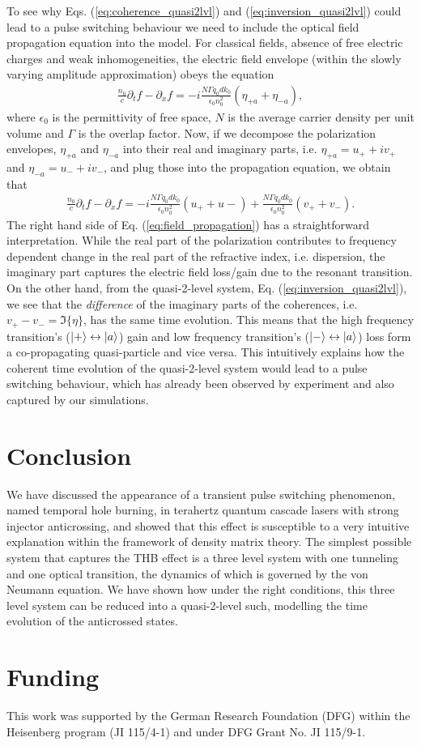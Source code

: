 \documentclass[]{spie}  %
\def\p{\partial}
\begin{document}
To see why Eqs. (\ref{eq:coherence_quasi2lvl}) and (\ref{eq:inversion_quasi2lvl}) could lead to a pulse switching behaviour we need to include the optical field propagation equation into the model. For classical fields, absence of free electric charges and weak inhomogeneities, the electric field envelope (within the slowly varying amplitude approximation) obeys the equation \cite{jirauschek2014modeling}
\begin{align}
	\frac{n_0}{c} \p_t f - \p_x f = -i\frac{N \Gamma q_0d k_0}{\epsilon_0 n_0^2}(\eta_{+a}+\eta_{-a}),
\end{align}
where $\epsilon_0$ is the permittivity of free space, $N$ is the average carrier density per unit volume and $\Gamma$ is the overlap factor. Now, if we decompose the polarization envelopes, $\eta_{+a}$ and $\eta_{-a}$ into their real and imaginary parts, i.e. $\eta_{+a} = u_{+}+iv_{+}$ and $\eta_{-a} = u_{-}+iv_{-}$, and plug those into the propagation equation, we obtain that
\begin{align}
\label{eq:field_propagation}
\frac{n_0}{c} \p_t f - \p_x f = -i\frac{N \Gamma q_0d k_0}{\epsilon_0 n_0^2}(u_{+}+u{-}) + \frac{N \Gamma q_0d k_0}{\epsilon_0 n_0^2}(v_{+}+v_{-}).
\end{align}
The right hand side of Eq. (\ref{eq:field_propagation}) has a straightforward interpretation. While the real part of the polarization contributes to frequency dependent change in the real part of the refractive index, i.e. dispersion, the imaginary part captures the electric field loss/gain due to the resonant transition. On the other hand, from the quasi-2-level system, Eq. (\ref{eq:inversion_quasi2lvl}), we see that the \emph{difference} of the imaginary parts of the coherences, i.e. $v_{+}-v_{-} = \Im\{\eta\}$, has the same time evolution. This means that the high frequency transition's ($\ket{+}\leftrightarrow\ket{a}$) gain and low frequency transition's ($\ket{-}\leftrightarrow\ket{a}$) loss form a co-propagating quasi-particle and vice versa. This intuitively explains how the coherent time evolution of the quasi-2-level system would lead to a pulse switching behaviour, which has already been observed by experiment\cite{burghoff2015evaluating} and also captured by our simulations.

\section{Conclusion}
We have discussed the appearance of a transient pulse switching phenomenon, named temporal hole burning, in terahertz quantum cascade lasers with strong injector anticrossing, and showed that this effect is susceptible to a very intuitive explanation within the framework of density matrix theory. The simplest possible system that captures the THB effect is a three level system with one tunneling and one optical transition, the dynamics of which is governed by the von Neumann equation. We have shown how under the right conditions, this three level system can be reduced into a quasi-2-level such, modelling the time evolution of the anticrossed states. 

\section*{Funding}
This work was supported by the German Research Foundation (DFG) within the Heisenberg program (JI 115/4-1) and under DFG Grant No. JI 115/9-1.


\end{document}
